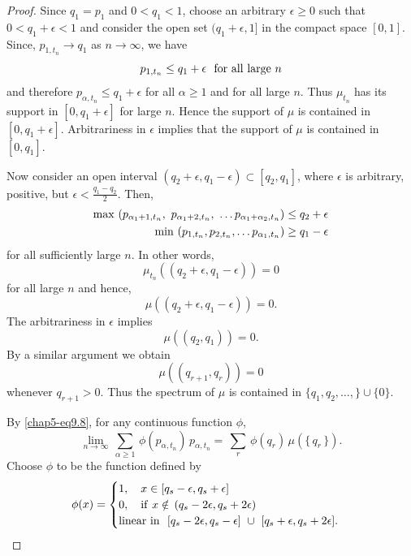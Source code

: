 \begin{proof}
Since $q_1=p_1$ and $0< q_1<1$, choose an arbitrary $\epsilon\geq 0$ such that $0<q_1+\epsilon<1$ and consider the open set $(q_1+\epsilon, 1]$ in the compact space $[0,1]$. Since, $p_{1, t_n}\rightarrow q_1$ as $n\rightarrow \infty$, we have 
$$  p_{1, t_n}\leq  q_1+\epsilon\ \ {\rm for \ all \ large}\ n$$
and therefore
$p_{\alpha,t_n}\leq q_1+\epsilon$ for all $\alpha\geq 1$ and for all large $n$. Thus $\mu_{t_n}$ has its support in $[0, q_1+\epsilon]$ for large $n$. Hence the support of $\mu$ is contained in $[0, q_1+\epsilon].$ Arbitrariness in $\epsilon$ implies that  the support of $\mu$ is contained in $[0,q_1]$. 

Now consider an open interval $(q_2+\epsilon, q_1-\epsilon)\subset 
[q_2,q_1]$, where $\epsilon$ is arbitrary, positive, but  $\epsilon <\frac{q_1-q_2}{2}$. Then, 
\begin{eqnarray*}
	{\rm max}\, \left(p_{\alpha_1+1,t_n},\ p_{\alpha_1+2,t_n},\ \ldots p_{\alpha_1+\alpha_2,t_n}\right)\leq q_2+ \epsilon \\ 
	{\rm min}\, \left(p_{1,t_n},p_{2,t_n},\ldots p_{\alpha_1,t_n}\right)\geq q_1 -\epsilon  
\end{eqnarray*}  
for all sufficiently large $n$. In other words, 
$$
\mu_{t_n}\left((q_2+\epsilon, q_1-\epsilon)\right)=0
$$
for all large $n$ and hence, 
$$
\mu\left((q_2+\epsilon, q_1-\epsilon)\right)=0.
$$
The arbitrariness in $\epsilon$ implies 
$$
\mu\left((q_2, q_1)\right)=0.
$$
By a similar argument we obtain 
$$
\mu\left((q_{r+1}, q_r)\right)=0
$$
whenever $q_{r+1}>0.$ Thus the spectrum of $\mu$ is contained in $\{q_1,q_2,\ldots , \} \cup \{0\}.$ 

By \eqref{chap5-eq9.8}, for any continuous function $\phi$, 
\begin{equation}
	\underset{n\rightarrow\infty}{\lim}\, \sum_{\alpha\geq 1}\, \phi(p_{\alpha, t_n})\, p_{\alpha, t_n}=\, \sum_{r}\, \phi(q_r)\, \mu\left( \{\,q_r\,\} \right). \label{chap5-eq9.15}
\end{equation} 
Choose $\phi$ to be the  function defined by    
\begin{equation}
	\phi(x)=
	\begin{cases}
	1, \quad   x\in [q_{s}-\epsilon, q_{s}+\epsilon] \\ 
		0,  \quad {\rm if\ } x\notin \, (q_{s}-2\epsilon, q_{s}+2\epsilon)  \\ 
		{\rm linear\ in}\ \   [q_{s}-2\epsilon, q_{s}-\epsilon]\,\,\cup\,\, [q_{s}+\epsilon, q_{s}+2\epsilon].
\end{cases}\label{chap5-eq9.16}
\end{equation} 


\end{proof}
